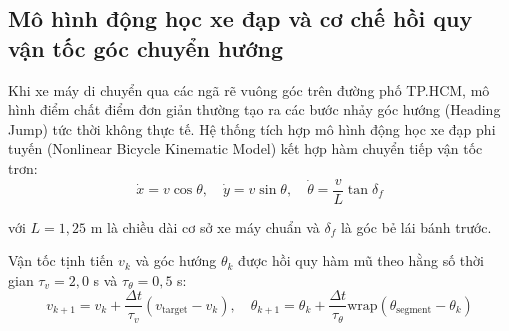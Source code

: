 \subsection{Mô hình động học xe đạp và cơ chế hồi quy vận tốc góc chuyển hướng}

\hspace{0.5cm} Khi xe máy di chuyển qua các ngã rẽ vuông góc trên đường phố TP.HCM, mô hình điểm chất điểm đơn giản thường tạo ra các bước nhảy góc hướng (Heading Jump) tức thời không thực tế. Hệ thống tích hợp mô hình động học xe đạp phi tuyến (Nonlinear Bicycle Kinematic Model) kết hợp hàm chuyển tiếp vận tốc trơn:
\begin{equation}
\dot{x} = v \cos\theta, \quad \dot{y} = v \sin\theta, \quad \dot{\theta} = \frac{v}{L} \tan\delta_f
\label{eq:bicycle-kinematic-model-equations}
\end{equation}

với $L = 1{,}25$ m là chiều dài cơ sở xe máy chuẩn và $\delta_f$ là góc bẻ lái bánh trước.

Vận tốc tịnh tiến $v_k$ và góc hướng $\theta_k$ được hồi quy hàm mũ theo hằng số thời gian $\tau_v = 2{,}0$ s và $\tau_\theta = 0{,}5$ s:
\begin{equation}
v_{k+1} = v_k + \frac{\Delta t}{\tau_v} (v_{\text{target}} - v_k), \quad \theta_{k+1} = \theta_k + \frac{\Delta t}{\tau_\theta} \text{wrap}(\theta_{\text{segment}} - \theta_k)
\label{eq:exponential-velocity-relaxation}
\end{equation}

\begin{table}[H]
\centering
\caption{Đo đạc gia tốc ly tâm và độ mượt mà quỹ đạo xe máy qua ngã tư đô thị}
\label{tab:motorcycle-turning-smoothness-table}
\end{table}

